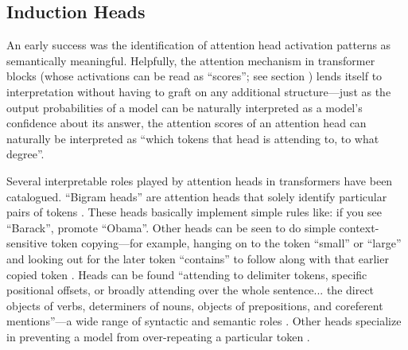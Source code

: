 
\subsection{Induction Heads}\label{inductionHeads}

An early success was the identification of
attention head activation patterns as semantically meaningful. Helpfully, the
attention mechanism in transformer blocks (whose activations can be read as
``scores''; see section ) lends itself to
interpretation without having to graft on any additional structure---just as
the output probabilities of a model can be naturally interpreted as a model's
confidence about its answer, the attention scores of an attention head can
naturally be interpreted as ``which tokens that head is attending to, to what
degree''.

Several interpretable roles played by attention heads in transformers have been
catalogued. ``Bigram heads'' are attention heads that solely identify
particular pairs of tokens \cite{elhage2021mathematical}. These heads basically
implement simple rules like: if you see ``Barack'', promote ``Obama''. Other
heads can be seen to do simple context-sensitive token copying---for example,
hanging on to the token ``small'' or ``large'' and looking out for the later
token ``contains'' to follow along with that earlier copied token
\cite{elhage2021mathematical}. Heads can be found ``attending to delimiter
tokens, specific positional offsets, or broadly attending over the whole
sentence... the direct objects of verbs, determiners of nouns, objects of
prepositions, and coreferent mentions''---a wide range of syntactic and
semantic roles \cite{clark2019does, voita-etal-2019-analyzing}. Other heads
specialize in preventing a model from over-repeating a particular token
\cite{mcdougall2023copy}.

